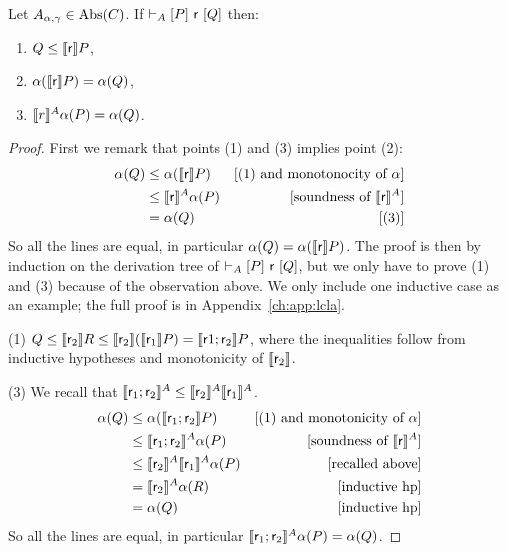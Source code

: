 \begin{theorem}\label{th:lcla:soundness-ext}
	Let $A_{\alpha, \gamma} \in \text{\normalfont Abs}(C)$.
	If $\vdash_{A}\nobreak[P]~\mathsf{r}~[Q]$ then:
	\begin{enumerate}
		\item $Q \le \llbracket\mathsf{r}\rrbracket P$,
		\item $\alpha(\llbracket\mathsf{r}\rrbracket P) = \alpha(Q)$,
		\item $\llbracket r\rrbracket^A \alpha(P) = \alpha(Q)$.
	\end{enumerate}
\end{theorem}
\begin{proof}
	First we remark that points (1) and (3) implies point (2):
	\begin{align*}
		\alpha(Q) & \le \alpha(\llbracket\mathsf{r}\rrbracket P)     & [\text{(1) and monotonocity of }\alpha] \\
		          & \le \llbracket\mathsf{r}\rrbracket^{A} \alpha(P) & [\text{soundness of }\llbracket\mathsf{r}\rrbracket^{A}] \\
		          & = \alpha(Q)                     & [\text{(3)}]
	\end{align*}
	So all the lines are equal, in particular $\alpha(Q) = \alpha(\llbracket\mathsf{r}\rrbracket P)$.
	The proof is then by induction on the derivation tree of $\vdash_{A}\nobreak[P]~\mathsf{r}~[Q]$, but we only have to prove (1) and (3) because of the observation above.
	We only include one inductive case as an example; the full proof is in Appendix~\ref{ch:app:lcla}.

	\noindent (1) $Q \le \llbracket\mathsf{r}_2\rrbracket R \le \llbracket\mathsf{r}_2\rrbracket (\llbracket\mathsf{r}_1\rrbracket P) = \llbracket\mathsf{r}1; \mathsf{r}_2\rrbracket P$, where the inequalities follow from inductive hypotheses and monotonicity of $\llbracket\mathsf{r}_2\rrbracket$.

	\noindent (3) We recall that $\llbracket\mathsf{r}_1; \mathsf{r}_2\rrbracket^{A} \le \llbracket\mathsf{r}_2\rrbracket^{A} \llbracket\mathsf{r}_1\rrbracket^{A}$.
	\begin{align*}
		\alpha(Q) & \le \alpha(\llbracket\mathsf{r}_1; \mathsf{r}_2\rrbracket P)                & [\text{(1) and monotonicity of }\alpha] \\
		          & \le \llbracket\mathsf{r}_1; \mathsf{r}_2\rrbracket^{A} \alpha(P)            & [\text{soundness of }\llbracket\mathsf{r}\rrbracket^{A}] \\
		          & \le \llbracket\mathsf{r}_2\rrbracket^{A} \llbracket\mathsf{r}_1\rrbracket^{A} \alpha(P) & [\text{recalled above}]                 \\
		          & = \llbracket\mathsf{r}_2\rrbracket^{A} \alpha(R)                       & [\text{inductive hp}]                   \\
		          & = \alpha(Q)                                           & [\text{inductive hp}]
	\end{align*}
	So all the lines are equal, in particular $\llbracket\mathsf{r}_1; \mathsf{r}_2\rrbracket^{A} \alpha(P) = \alpha(Q)$.
\end{proof}

